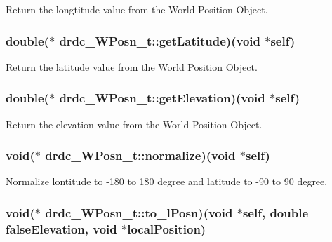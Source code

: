 Return the longtitude value from the World Position Object. 

\hypertarget{structdrdc__WPosn__t_4482117daa37ce978f11917980821117}{
\subsubsection[getLatitude]{\setlength{\rightskip}{0pt plus 5cm}double($\ast$ {\bf drdc\_\-WPosn\_\-t::getLatitude})(void $\ast$self)}}
\label{structdrdc__WPosn__t_4482117daa37ce978f11917980821117}


Return the latitude value from the World Position Object. 

\hypertarget{structdrdc__WPosn__t_cdea4c899a633aad0c32150bcce1b0b6}{
\subsubsection[getElevation]{\setlength{\rightskip}{0pt plus 5cm}double($\ast$ {\bf drdc\_\-WPosn\_\-t::getElevation})(void $\ast$self)}}
\label{structdrdc__WPosn__t_cdea4c899a633aad0c32150bcce1b0b6}


Return the elevation value from the World Position Object. 

\hypertarget{structdrdc__WPosn__t_e1872c4419c8931346d0aa0e0cb9a735}{
\subsubsection[normalize]{\setlength{\rightskip}{0pt plus 5cm}void($\ast$ {\bf drdc\_\-WPosn\_\-t::normalize})(void $\ast$self)}}
\label{structdrdc__WPosn__t_e1872c4419c8931346d0aa0e0cb9a735}


Normalize lontitude to -180 to 180 degree and latitude to -90 to 90 degree. 

\hypertarget{structdrdc__WPosn__t_a82ed390a46b077cc3a9c02be37bf784}{
\subsubsection[to\_\-lPosn]{\setlength{\rightskip}{0pt plus 5cm}void($\ast$ {\bf drdc\_\-WPosn\_\-t::to\_\-lPosn})(void $\ast$self, double falseElevation, void $\ast$localPosition)}}
\label{structdrdc__WPosn__t_a82ed390a46b077cc3a9c02be37bf784}


